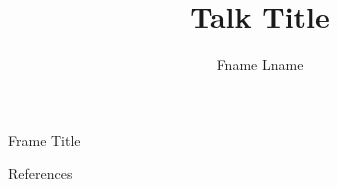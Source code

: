 \documentclass[14pt,compress,usenames,dvipsnames,aspectratio=169]{beamer}
\title{\textbf{Talk Title}}
\author{Fname Lname}
\institute[]{%
	Institute Name
}
\date{}
\begin{document}

\begin{frame}[plain]
	\titlepage
\end{frame}

\begin{frame}{Frame Title}

\end{frame}

\begin{frame}{References}
\end{frame}
\end{document}
